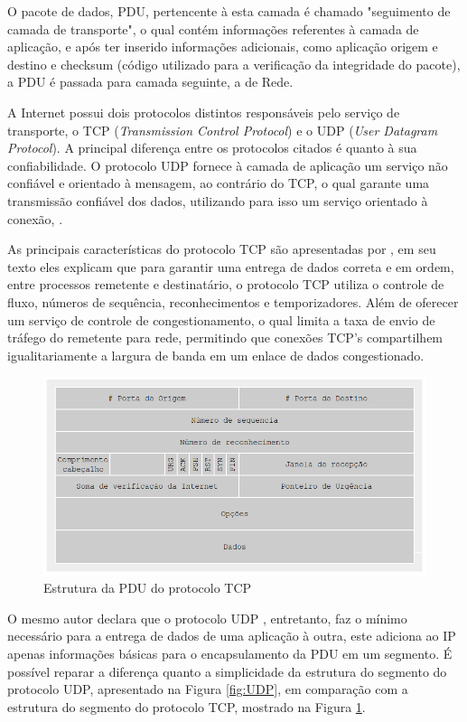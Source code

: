O pacote de dados, PDU, pertencente à esta camada é chamado "seguimento de camada de transporte", o qual contém informações referentes à camada de aplicação, e após ter inserido informaç\~oes adicionais, como aplicaç\~ao origem e destino e checksum (c\'odigo utilizado para a verificaç\~ao da integridade do pacote), a PDU é passada para camada seguinte, a de Rede.

A Internet possui dois protocolos distintos responsáveis pelo serviço de transporte, o TCP (\textit{Transmission Control Protocol}) e o UDP (\textit{User Datagram Protocol}). A principal diferença entre os protocolos citados é quanto à sua confiabilidade. O protocolo UDP fornece à camada de aplicação um serviço não confiável e orientado à mensagem, ao contrário do TCP, o qual garante uma transmissão confiável dos dados, utilizando para isso um serviço orientado à conexão, \cite{COMER}.

As principais características do protocolo TCP são apresentadas por , em seu texto eles explicam que para garantir uma entrega de dados correta e em ordem, entre processos remetente e destinatário, o protocolo TCP utiliza o controle de fluxo, números de sequência, reconhecimentos e temporizadores. Além de oferecer um serviço de controle de congestionamento, o qual limita a taxa de envio de tráfego do remetente para rede, permitindo que conexões TCP's compartilhem igualitariamente a largura de banda em um enlace de dados congestionado.

\begin{figure}[H]
	\centering
    \includegraphics[width=\textwidth]{04-figuras/TCP.png}
    \caption{Estrutura da PDU do protocolo TCP}
    \label{fig:TCP}
\end{figure}

O mesmo autor declara que o protocolo UDP \cite{RFC768}, entretanto, faz o mínimo necessário para a entrega de dados de uma aplicação à outra, este adiciona ao IP apenas informações básicas para o encapsulamento da PDU em um segmento. É possível reparar a diferença quanto a simplicidade da estrutura do segmento do protocolo UDP, apresentado na Figura \ref{fig:UDP}, em comparação com a estrutura do segmento do protocolo TCP, mostrado na Figura \ref{fig:TCP}.

